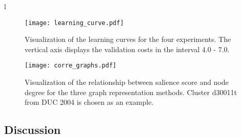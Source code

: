 \documentclass[11pt,a4paper]{article}
\begin{document}
\begin{table}[]
\begin{tabular}{l}
\begin{figure}[h]
    \hspace{-0.4mm}
    \texttt{[image: learning\_curve.pdf]}
    \caption{Visualization of the learning curves for the four experiments. The vertical axis displays the validation costs in the interval 4.0 - 7.0.}
    \label{fig:learning_curve}
\end{figure}

\begin{table}[h]
\centering
\hspace{-1.3mm}
\caption{Characteristics of the three graph representations, averaged over the clusters (i.e. graphs) in DUC 2004. Note that max edge weight in all three representations is 1.0 due to rescaling for consistency. The degree of each node is calculated as the sum of edge weights.}
\label{tb:graph_characteristics}
\vspace{-5mm}
\end{table}

\begin{figure*}[t]
\hspace{-1mm}\texttt{[image: corre\_graphs.pdf]}
    \caption{Visualization of the relationship between salience score and node degree for the three graph representation methods. Cluster d30011t from DUC 2004 is chosen as an example.\vspace{3mm}}
    \label{fig:d30011t_scatter}
\vspace{-5mm}
\end{figure*}


\subsection{Discussion}



\end{tabular}
\end{table}
\end{document}
